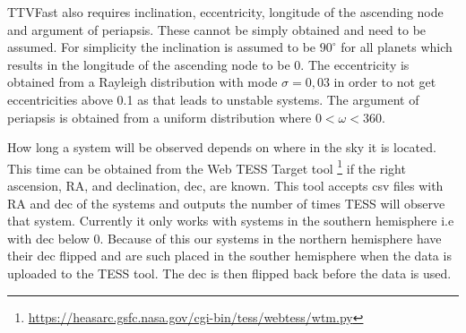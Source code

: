 \documentclass[12pt]{report}
\begin{document}
	TTVFast also requires inclination, eccentricity, longitude of the ascending node and argument of periapsis. These cannot be simply obtained and need to be assumed. For simplicity the inclination is assumed to be $90^{\circ}$ for all planets which results in the longitude of the ascending node to be 0. The eccentricity is obtained from a Rayleigh distribution with mode $\sigma = 0,03$ in order to not get eccentricities above 0.1 as that leads to unstable systems. The argument of periapsis is obtained from a uniform distribution where $0 < \omega < 360$. 
	
	How long a system will be observed depends on where in the sky it is located. This time can be obtained from the Web TESS Target tool \footnote{\url{https://heasarc.gsfc.nasa.gov/cgi-bin/tess/webtess/wtm.py}} if the right ascension, RA, and declination, dec, are known. This tool accepts csv files with RA and dec of the systems and outputs the number of times TESS will observe that system. Currently it only works with systems in the southern hemisphere i.e with dec below 0. Because of this our systems in the northern hemisphere have their dec flipped and are such placed in the souther hemisphere when the data is uploaded to the TESS tool. The dec is then flipped back before the data is used. 
	
\end{document}
